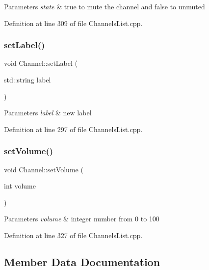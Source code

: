 \begin{DoxyParams}{Parameters}
{\em state} & true to mute the channel and false to unmuted \\
\hline
\end{DoxyParams}


Definition at line 309 of file Channels\+List.\+cpp.

\mbox{\label{class_channel_a1d0ac75e7416c18c3695de418e9137e1}} 
\subsubsection{\texorpdfstring{set\+Label()}{setLabel()}}
{\footnotesize\ttfamily void Channel\+::set\+Label (\begin{DoxyParamCaption}\item[{std\+::string}]{label }\end{DoxyParamCaption})}


\begin{DoxyParams}{Parameters}
{\em label} & new label \\
\hline
\end{DoxyParams}


Definition at line 297 of file Channels\+List.\+cpp.

\mbox{\label{class_channel_a381d4ad81038cb9bcf393fa47b13cdb0}} 
\subsubsection{\texorpdfstring{set\+Volume()}{setVolume()}}
{\footnotesize\ttfamily void Channel\+::set\+Volume (\begin{DoxyParamCaption}\item[{int}]{volume }\end{DoxyParamCaption})}


\begin{DoxyParams}{Parameters}
{\em volume} & integer number from 0 to 100 \\
\hline
\end{DoxyParams}


Definition at line 327 of file Channels\+List.\+cpp.



\subsection{Member Data Documentation}
\mbox{\label{class_channel_a7c8a0b25848ab487c39a803785f7ed21}} 
